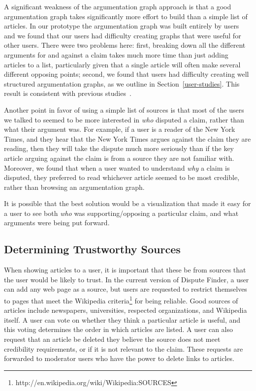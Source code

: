 \documentclass{www2010-submission}
\begin{document}
A significant weakness of the argumentation graph approach is that a good argumentation graph takes significantly more effort to build than a simple list of articles. In our prototype the argumentation graph was built entirely by users and we found that our users had difficulty creating graphs that were useful for other users. There were two problems here: first, breaking down all the different arguments for and against a claim takes much more time than just adding articles to a list, particularly given that a single article will often make several different opposing points; second, we found that users had difficulty creating well structured argumentation graphs, as we outline in Section~\ref{user-studies}. This result is consistent with previous studies~\cite{Isenmann1997}.

Another point in favor of using a simple list of sources is that most of the users we talked to seemed to be more interested in {\it who} disputed a claim, rather than what their argument was. For example, if a user is a reader of the New York Times, and they hear that the New York Times argues against the claim they are reading, then they will take the dispute much more seriously than if the key article arguing against the claim is from a source they are not familiar with. Moreover, we found that when a user wanted to understand {\it why} a claim is disputed, they preferred to read whichever article seemed to be most credible, rather than browsing an argumentation graph.

It is possible that the best solution would be a visualization that made it easy for a user to see both {\it who} was supporting/opposing a particular claim, and what arguments were being put forward.


\subsection{Determining Trustworthy Sources}

When showing articles to a user, it is important that these be from sources that the user would be likely to trust. In the current version of Dispute Finder, a user can add any web page as a source, but users are requested to restrict themselves to pages that meet the Wikipedia criteria\footnote{http://en.wikipedia.org/wiki/Wikipedia:SOURCES} for being reliable. Good sources of articles include newspapers, universities, respected organizations, and Wikipedia itself. A user can vote on whether they think a particular article is useful, and this voting determines the order in which articles are listed. A user can also request that an article be deleted they believe the source does not meet credibility requirements, or if it is not relevant to the claim. These requests are forwarded to moderator users who have the power to delete links to articles.
\end{document}

